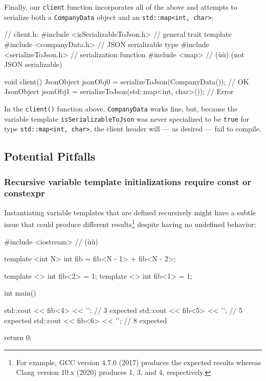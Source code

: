 \noindent Finally, our \lstinline!client! function incorporates all of the above and
attempts to serialize both a \lstinline!CompanyData! object and an
\lstinline!std::map<int,!~\lstinline!char>!:

\begin{emcppslisting}[emcppsbatch=e6]
// client.h:
#include <isSerializableToJson.h>  // general trait template
#include <companyData.h>           // JSON serializable type
#include <serializeToJson.h>       // serialization function
#include <map>                     // (ù{}ù) (not JSON serializable)

void client()
{
    JsonObject jsonObj0 = serializeToJson(CompanyData());          // OK
    JsonObject jsonObj1 = serializeToJson(std::map<int, char>());  // Error
}
\end{emcppslisting}
    
\noindent In the \lstinline!client()! function above, \lstinline!CompanyData! works
fine, but, because the variable template \lstinline!isSerializableToJson!
was never specialized to be \lstinline!true! for type
\mbox{\lstinline!std::map<int,! \lstinline!char>!}, the client header will --- as
desired --- fail to compile.

\subsection[Potential Pitfalls]{Potential Pitfalls}\label{variabletemplate-potential-pitfalls}

\subsubsection[Recursive variable template initializations require {\tt const} or {\tt constexpr}]{Recursive variable template initializations require {\SubsubsecCode const} or {\SubsubsecCode constexpr}}\label{recursive-variable-template-initializations-require-const-or-constexpr}

Instantiating variable templates that are defined recursively might have a subtle issue that could produce different results{\cprotect\footnote{For
example, GCC version 4.7.0 (2017) produces the expected results whereas
  Clang version 10.x (2020) produces 1, 3, and 4, respectively.}} despite having no undefined behavior:

\begin{emcppslisting}
#include <iostream>  // (ù{}ù)

template <int N>
int fib = fib<N - 1> + fib<N - 2>;

template <> int fib<2> = 1;
template <> int fib<1> = 1;

int main()
{
    std::cout << fib<4> << '\n';  // 3 expected
    std::cout << fib<5> << '\n';  // 5 expected
    std::cout << fib<6> << '\n';  // 8 expected

    return 0;
}
\end{emcppslisting}
    
